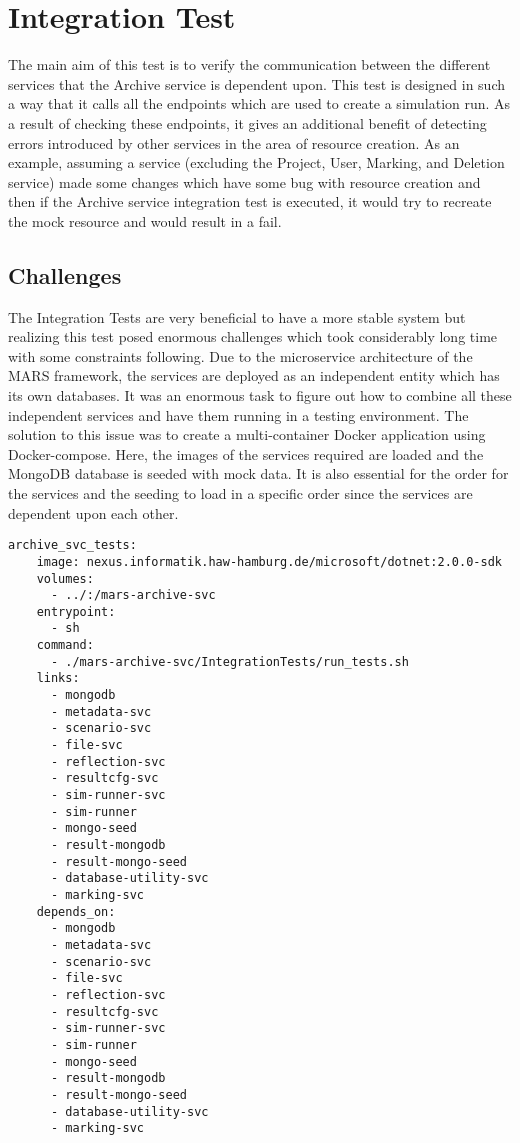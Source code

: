 \section{Integration Test}
The main aim of this test is to verify the communication between the different services that the Archive service is dependent upon. This test is designed in 
such a way that it calls all the endpoints which are used to create a simulation run. As a result of checking
these endpoints, it gives an additional benefit of detecting errors introduced by other services in the area of resource creation. As an example, assuming a service
(excluding the Project, User, Marking, and Deletion service)
made some changes which have some bug with resource creation and then if the Archive service integration test is executed, it would try to recreate the mock resource
and would result in a fail.

\subsection{Challenges}
The Integration Tests are very beneficial to have a more stable system but realizing this test posed enormous challenges which took considerably long time 
with some constraints following. Due to the microservice architecture of the MARS framework, the services are deployed as an independent entity which has its own databases.
It was an enormous task to figure out how to combine all these independent services and have them running in a testing environment. The solution to this issue
was to create a multi-container Docker application using Docker-compose. Here, the images of the services required are loaded and the MongoDB database 
is seeded with mock data. It is also essential for the order for the services and the seeding to load in a specific order since the services are dependent upon
each other.  

\begin{lstlisting}[language=docker-compose,caption={Docker compose configuration snippet for Archive service Integration Test}, captionpos=b, breaklines=true,label={code:integCompose}]
archive_svc_tests:
    image: nexus.informatik.haw-hamburg.de/microsoft/dotnet:2.0.0-sdk
    volumes:
      - ../:/mars-archive-svc
    entrypoint:
      - sh
    command:
      - ./mars-archive-svc/IntegrationTests/run_tests.sh
    links:
      - mongodb
      - metadata-svc
      - scenario-svc
      - file-svc
      - reflection-svc
      - resultcfg-svc
      - sim-runner-svc
      - sim-runner
      - mongo-seed
      - result-mongodb
      - result-mongo-seed
      - database-utility-svc
      - marking-svc
    depends_on:
      - mongodb
      - metadata-svc
      - scenario-svc
      - file-svc
      - reflection-svc
      - resultcfg-svc
      - sim-runner-svc
      - sim-runner
      - mongo-seed
      - result-mongodb
      - result-mongo-seed
      - database-utility-svc
      - marking-svc
\end{lstlisting}      

